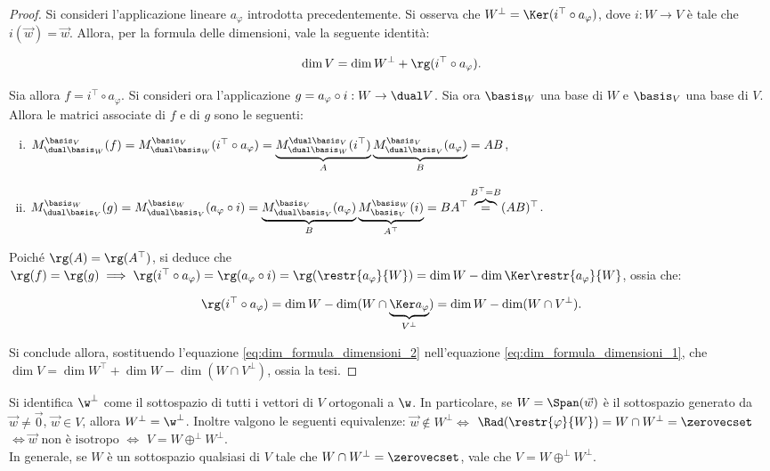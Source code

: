 \begin{proof}
	Si consideri l'applicazione lineare $a_\varphi$ introdotta precedentemente. Si osserva che $W^\perp = \Ker (i^\top \circ a_\varphi)$, dove $i : W \to V$ è tale che $i(\vec w) = \vec w$. Allora,
	per la formula delle dimensioni, vale la seguente identità: 
	
	\begin{equation}
		\label{eq:dim_formula_dimensioni_1}
		\dim V = \dim W^\perp + \rg (i^\top \circ a_\varphi). 
	\end{equation}
	
	\vskip 0.05in
	
	Sia allora $f = i^\top \circ a_\varphi$.
	Si consideri ora l'applicazione $g = a_\varphi \circ i : W \to \dual V$. Sia ora $\basis_W$ una base di $W$ e
	$\basis_V$ una base di $V$. Allora le matrici associate di $f$ e di $g$ sono le seguenti:
	
	\begin{enumerate}[(i)]
		\item $M_{\dual \basis_W}^{\basis_V}(f) = M_{\dual \basis_W}^{\basis_V}(i^\top \circ a_\varphi) =
		\underbrace{M_{\dual \basis_W}^{\dual \basis_V}(i^\top)}_A \underbrace{M_{\dual \basis_V}^{\basis_V}(a_\varphi)}_B = AB$,
		\item $M_{\dual \basis_V}^{\basis_W}(g) = M_{\dual \basis_V}^{\basis_W}(a_\varphi \circ i) =
		\underbrace{M_{\dual \basis_V}^{\basis_V}(a_\varphi)}_B \underbrace{M_{\basis_V}^{\basis_W}(i)}_{A^\top} = BA^\top \overbrace{=}^{B^\top = B} (AB)^\top$.
	\end{enumerate}
	
	Poiché $\rg(A) = \rg(A^\top)$, si deduce che $\rg(f) = \rg(g) \implies \rg(i^\top \circ a_\varphi) = \rg(a_\varphi \circ i) = \rg(\restr{a_\varphi}{W}) = \dim W - \dim \Ker \restr{a_\varphi}{W}$, ossia che:
	
	\begin{equation}
		\label{eq:dim_formula_dimensioni_2}
		\rg(i^\top \circ a_\varphi) = \dim W - \dim (W \cap \underbrace{\Ker a_\varphi}_{V^\perp}) = \dim W - \dim (W \cap V^\perp).
	\end{equation}
	
	Si conclude allora, sostituendo l'equazione \eqref{eq:dim_formula_dimensioni_2} nell'equazione \eqref{eq:dim_formula_dimensioni_1}, che $\dim V = \dim W^\top + \dim W - \dim (W \cap V^\perp)$, ossia la tesi.
\end{proof}

\begin{remark} Si identifica $\w^\perp$ come il sottospazio di tutti i vettori di $V$ ortogonali a $\w$.
	In particolare, se $W = \Span(\vec w)$ è il sottospazio generato da $\vec w \neq \vec 0$, $\vec w \in V$, allora $W^\perp = \w^\perp$. Inoltre valgono le seguenti equivalenze: $\vec w \notin W^\perp \iff$ $\Rad (\restr{\varphi}{W}) = W \cap W^\perp = \zerovecset$ $\iff \vec w \text{ non è isotropo } \iff$ $V = W \oplus^\perp W^\perp$. \\
	
	In generale, se $W$ è un sottospazio qualsiasi di $V$ tale che $W \cap W^\perp = \zerovecset$, vale
	che $V = W \oplus^\perp W^\perp$.
\end{remark}

